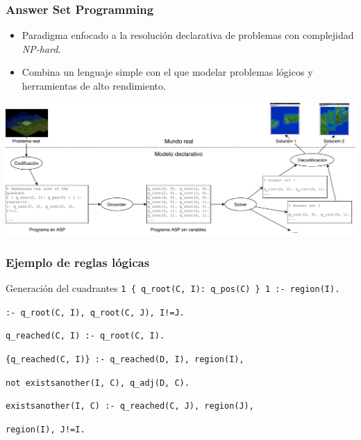 \begin{frame}
	\frametitle{Answer Set Programming}

	\begin{itemize}
		\item<1-> Paradigma enfocado a la \textcolor{UDCpink}{resolución declarativa} de problemas con complejidad \textcolor{UDCpink}{\textit{NP-hard}}.
		
		\vspace{0.5em}
		
		\item<2-> Combina un \textcolor{UDCpink}{lenguaje simple} con el que modelar problemas lógicos y \textcolor{UDCpink}{herramientas de alto rendimiento}.
	\end{itemize}

	\vspace{1em}
	
	\pause[3]
	
	\includegraphics[width=\textwidth]{images/funcionamiento-asp.pdf}
	
\end{frame}

\begin{frame}
	\frametitle{Ejemplo de reglas lógicas}
	
	\begin{block}{Generación del cuadrantes}
	\vspace{1em}
	\hspace{2em}\texttt{1 \{ q\_root(C, I): q\_pos(C) \} 1 :- region(I).}
	
	\hspace{2em}\texttt{:- q\_root(C, I), q\_root(C, J), I!=J.}
	
	\vspace{2em}
	
	\hspace{2em}\texttt{q\_reached(C, I) :- q\_root(C, I).} 
	
	\hspace{2em}\texttt{\{q\_reached(C, I)\} :- q\_reached(D, I), region(I),}
	
	\hspace{4em}\texttt{not existsanother(I, C), q\_adj(D, C).}
	
	\hspace{2em}\texttt{existsanother(I, C) :- q\_reached(C, J), region(J),}
	
	\hspace{4em}\texttt{region(I), J!=I.}
	\vspace{1em}
	\end{block}
	
\end{frame}